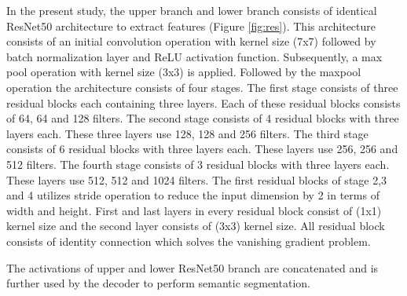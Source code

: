 \documentclass[journal]{IEEEtran}
\begin{document}
In the present study, the upper branch and lower branch consists of identical ResNet50 architecture to extract features (Figure \ref{fig:res}). This architecture consists of an initial convolution operation with kernel size (7x7)  followed by batch normalization layer and ReLU activation function. Subsequently, a max pool operation with kernel size (3x3) is applied. Followed by the maxpool operation the architecture consists of four stages. The first stage consists of three residual blocks each containing three layers. Each of these residual blocks consists of 64, 64 and 128 filters. The second stage consists of 4 residual blocks with three layers each. These three layers use 128, 128 and 256 filters. The third stage consists of 6 residual blocks with three layers each. These layers use 256, 256 and 512 filters. The fourth stage consists of 3 residual blocks with three layers each. These layers use 512, 512 and 1024 filters. The first residual blocks of stage 2,3 and 4 utilizes stride operation to reduce the input dimension by 2 in terms of width and height. First and last layers in every residual block consist of (1x1) kernel size and the second layer consists of (3x3) kernel size. All residual block consists of identity connection which solves the vanishing gradient problem. 



The activations of upper and lower ResNet50 branch are concatenated and is further used by the decoder to perform semantic segmentation.   
\end{document}
